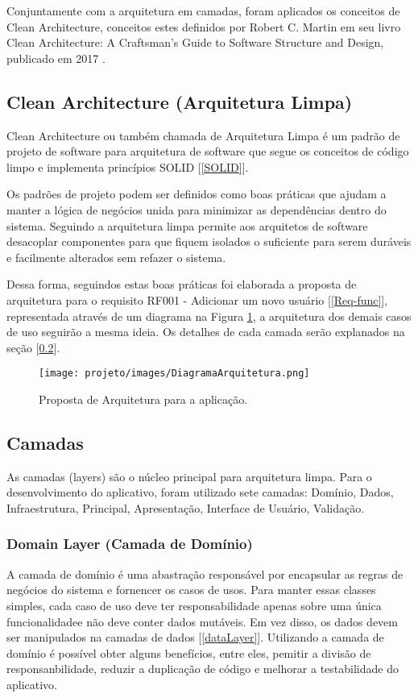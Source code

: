 \documentclass[12pt]{article}
\begin{document}
Conjuntamente com a arquitetura em camadas, foram aplicados os conceitos de Clean Architecture, conceitos estes definidos por Robert C. Martin em seu livro Clean Architecture: A Craftsman's Guide to Software Structure and Design, publicado em 2017 \cite{cleanArchitecture}.

\subsection{Clean Architecture (Arquitetura Limpa)}
Clean Architecture ou também chamada de Arquitetura Limpa é um padrão de projeto de software para arquitetura de software que segue os conceitos de código limpo e implementa princípios SOLID [\ref{SOLID}].

Os padrões de projeto podem ser definidos como boas práticas que ajudam a manter a lógica de negócios unida para minimizar as dependências dentro do sistema. Seguindo a arquitetura limpa permite aos arquitetos de software desacoplar componentes para que fiquem isolados o suficiente para serem duráveis e facilmente alterados sem refazer o sistema.

Dessa forma, seguindos estas boas práticas foi elaborada a proposta de arquitetura para o requisito RF001 - Adicionar um novo usuário [\ref{Req-func}], representada através de um diagrama na Figura \ref{fig:DiagramaArquitetura}, a arquitetura dos demais casos de uso seguirão a mesma ideia. Os detalhes de cada camada serão explanados na seção [\ref{layers}].

\begin{figure}[!ht]
  \centering
  \texttt{[image: projeto/images/DiagramaArquitetura.png]}
  \caption{Proposta de Arquitetura para a aplicação.}
  \label{fig:DiagramaArquitetura}
\end{figure}

\subsection{Camadas}
\label{layers}
As camadas (layers) são o núcleo principal para arquitetura limpa. 
Para o desenvolvimento do aplicativo, foram utilizado sete camadas: Domínio, Dados, Infraestrutura, Principal, Apresentação, Interface de Usuário, Validação.

\subsubsection{Domain Layer (Camada de Domínio)}
\label{domainLayer}
A camada de domínio é uma abastração responsável por encapsular as regras de negócios do sistema e fornencer os casos de usos. Para manter essas classes simples, cada caso de uso deve ter responsabilidade apenas sobre uma única funcionalidadee não deve conter dados mutáveis. Em vez disso, os dados devem ser manipulados na camadas de dados [\ref{dataLayer}]. Utilizando a camada de domínio é possível obter alguns benefícios, entre eles, pemitir a divisão de responsanbilidade, reduzir a duplicação de código e melhorar a testabilidade do aplicativo.
\end{document}
